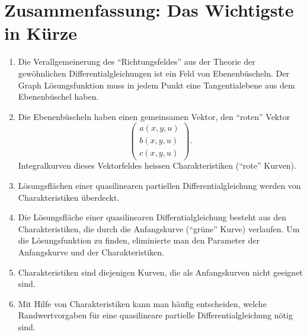 




\section{Zusammenfassung: Das Wichtigste in Kürze}
\begin{enumerate}
\item Die Verallgemeinerung des ``Richtungsfeldes'' aus der Theorie der
gewöhnlichen Differentialgleichungen ist ein Feld von Ebenenbüscheln.
Der Graph Lösungsfunktion muss in jedem Punkt eine Tangentialebene aus
dem Ebenenbüschel haben.
\item Die Ebenenbüscheln haben einen gemeinsamen Vektor, den ``roten''
Vektor
\[
\begin{pmatrix}
a(x,y,u)\\
b(x,y,u)\\
c(x,y,u)
\end{pmatrix}.
\]
Integralkurven dieses Vektorfeldes heissen Charakteristiken (``rote'' Kurven).
\item Lösungsflächen einer quasilinearen partiellen Differentialgleichung
werden von Charakteristiken überdeckt.
\item Die Lösungsfläche einer quasilinearen Differntialgleichung besteht aus
den Charakteristiken, die durch die Anfangskurve
(``grüne'' Kurve) verlaufen.
Um die Lösungsfunktion zu finden, eliminierte man den Parameter der
Anfangskurve und der Charakteristiken.
\item Charakteristiken sind diejenigen Kurven, die als Anfangskurven
nicht geeignet sind.
\item Mit Hilfe von Charakteristiken kann man häufig entscheiden,
welche Randwertvorgaben für eine quasilineare partielle Differentialgleichung
nötig sind.
\end{enumerate}
